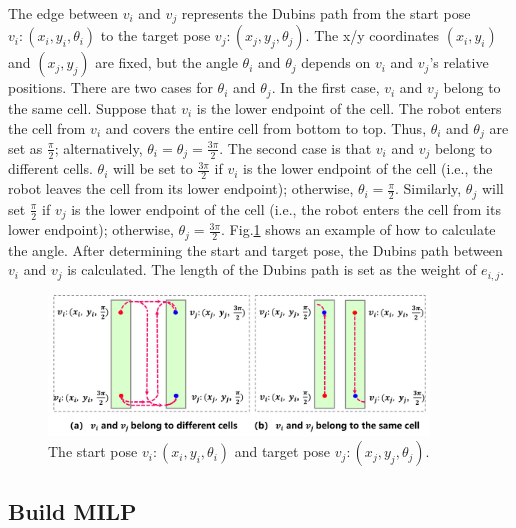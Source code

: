 \documentclass[journal,article,submit,pdftex,moreauthors]{Definitions/mdpi}
\begin{document}
The edge between $v_i$ and $v_j$ represents the Dubins path from the start pose $v_i:(x_i,y_i,\theta_i)$ to the target pose $v_j:(x_j,y_j,\theta_j)$. The x/y coordinates $(x_i,y_i)$ and $(x_j,y_j)$ are fixed, but the angle $\theta_i$ and $\theta_j$ depends on $v_i$ and $v_j$'s relative positions. There are two cases for $\theta_i$ and $\theta_j$. In the first case, $v_i$ and $v_j$ belong to the same cell. Suppose that $v_i$ is the lower endpoint of the cell. The robot enters the cell from $v_i$ and covers the entire cell from bottom to top. Thus, $\theta_i$ and $\theta_j$ are set as $ \frac{\pi}{2} $; alternatively, $\theta_i = \theta_j = \frac{3\pi}{2}$. The second case is that $v_i$ and $v_j$ belong to different cells. $\theta_i$ will be set to $ \frac{3\pi}{2} $ if $v_i$ is the lower endpoint of the cell (i.e., the robot leaves the cell from its lower endpoint); otherwise, $\theta_i = \frac{\pi}{2}$. Similarly, $\theta_j$ will set $ \frac{\pi}{2} $ if $v_j$ is the lower endpoint of the cell (i.e., the robot enters the cell from its lower endpoint); otherwise, $\theta_j = \frac{3\pi}{2}$. Fig.\ref{Fig_pose} shows an example of how to calculate the angle. After determining the start and target pose, the Dubins path between $v_i$ and $v_j$ is calculated. The length of the Dubins path is set as the weight of $e_{i,j}$.

\begin{figure}[htb] %
	\centering  %
    \vspace{0 cm} %
    \includegraphics[width=0.9\textwidth]{3.jpg}
    \caption{ The start pose $v_i:(x_i,y_i,\theta_i)$ and target pose $v_j:(x_j,y_j,\theta_j)$.}
   \label{Fig_pose}
\end{figure}

\subsection{Build MILP}
\end{document}

